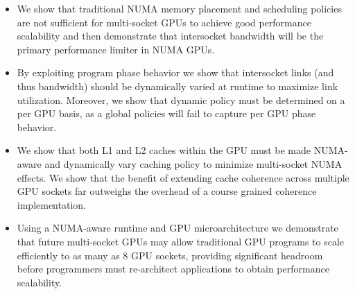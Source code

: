 \begin{itemize}

\item We show that traditional NUMA memory placement and 
scheduling policies are not sufficient for multi-socket GPUs to achieve good 
performance scalability and then demonstrate that intersocket bandwidth will be 
the primary performance limiter in NUMA GPUs.

\item By exploiting program phase behavior we show that intersocket links (and 
thus bandwidth) should be dynamically varied at runtime to maximize link 
utilization. Moreover, we show that dynamic policy must be determined on a per 
GPU basis, as a global policies will fail to capture per GPU phase behavior.

\item We show that both L1 and L2 caches within the GPU must be made NUMA-aware 
and dynamically vary caching policy to minimize multi-socket NUMA effects.  We 
show that the benefit of extending cache coherence across multiple GPU sockets 
far outweighs the overhead of a course grained coherence implementation.

\item Using a NUMA-aware runtime and GPU microarchitecture we demonstrate that
future  multi-socket GPUs may allow traditional GPU programs to scale efficiently to as 
many as 8 GPU sockets, providing significant headroom before programmers must 
re-architect applications to obtain performance scalability.

\end{itemize}
